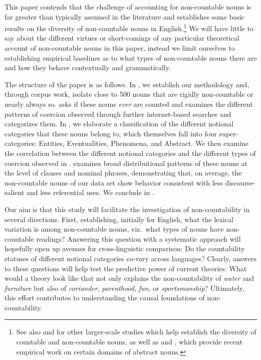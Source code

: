 \documentclass[output=paper]{langscibook}
\begin{document}
This paper contends that the challenge of accounting for non-countable nouns is far greater than typically assumed in the literature  and establishes some basic results on the diversity of non-countable nouns in English.\footnote{See also \citet{Allan1980} and \citet{kiss2016sense} for other larger-scale studies which help establish the diversity of countable and non-countable nouns, as well as \citet{sutton2019singular} and \citet{Sutton_Filip_2020}, which provide recent empirical work on certain domains of abstract nouns.}   We will have little to say about the different virtues or short-comings of any particular theoretical account of non-countable nouns in this paper, instead we limit ourselves to establishing empirical baselines as to what types of non-countable nouns there are and how they behave contextually and grammatically.


The structure of the paper is as follows.  In , we establish our methodology and, through corpus work, isolate close to 500 nouns that are rigidly non-countable or nearly always so.  asks if these nouns \textit{ever} are counted and examines  the different patterns of coercion observed through further internet-based searches and categorizes them.  In , we elaborate a classification of  the different notional categories that these nouns belong to, which themselves fall into four super-categories: Entities, Eventualities, Phenomena, and Abstract.  We then examine the correlation between the different notional categories and the  different types of coercion observed in .   examines broad distributional patterns of these nouns at the level of clauses and nominal phrases, demonstrating that, on average, the non-countable nouns of our data set show behavior consistent with less discourse-salient and less referential uses.  We conclude in .




Our aim is that this study will facilitate the investigation of non-countability in several directions.  First, establishing, initially for English, what the lexical variation is among non-countable nouns, viz.\ what types of nouns have non-countable readings?  Answering this question   with a systematic approach will hopefully open up avenues for cross-linguistic comparison: Do the countability statuses of different notional categories co-vary across languages?  Clearly, answers to these questions will help test the predictive power of current theories: What would a theory look like that not only explains the non-countability of \textit{water} and \textit{furniture} but also of \textit{coriander}, \textit{parenthood}, \textit{fun}, or \textit{sportsmanship}?  Ultimately, this effort contributes to understanding the causal foundations of non-countability.
\end{document}
